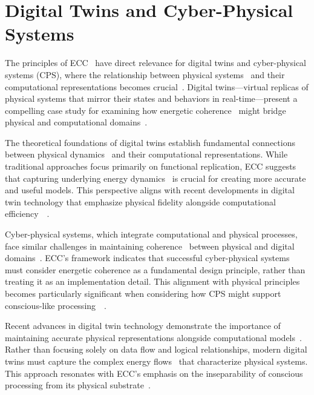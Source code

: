 \section{Digital Twins and Cyber-Physical Systems}

 The principles of ECC~ have direct relevance for digital twins and cyber-physical systems (CPS), where the relationship between physical systems~ and their computational representations becomes crucial~\cite{Fuller2020,Boschert2019}. Digital twins—virtual replicas of physical systems that mirror their states and behaviors in real-time—present a compelling case study for examining how energetic coherence~ might bridge physical and computational domains~\cite{Jones2020,Rasheed2020}.

The theoretical foundations of digital twins establish fundamental connections between physical dynamics~ and their computational representations. While traditional approaches focus primarily on functional replication, ECC suggests that capturing underlying energy dynamics~ is crucial for creating more accurate and useful models. This perspective aligns with recent developments in digital twin technology that emphasize physical fidelity alongside computational efficiency~~\cite{Minerva2020,Thompson2007}.

Cyber-physical systems, which integrate computational and physical processes, face similar challenges in maintaining coherence~ between physical and digital domains~\cite{Lee2018,Wolf2020}. ECC's framework indicates that successful cyber-physical systems must consider energetic coherence as a fundamental design principle, rather than treating it as an implementation detail. This alignment with physical principles becomes particularly significant when considering how CPS might support conscious-like processing~~\cite{Rajkumar2018,van1995might}.

Recent advances in digital twin technology demonstrate the importance of maintaining accurate physical representations alongside computational models~\cite{Grieves2021,Rasheed2020}. Rather than focusing solely on data flow and logical relationships, modern digital twins must capture the complex energy flows~ that characterize physical systems. This approach resonates with ECC's emphasis on the inseparability of conscious processing from its physical substrate~\cite{Liu2021,Thompson2001}.

